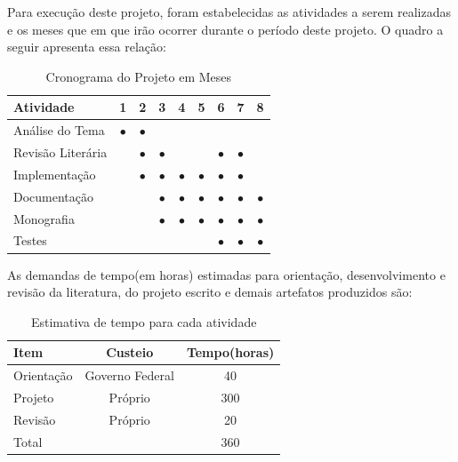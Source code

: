 \documentclass[
	12pt,				    %
	openright,			    %
	oneside,			    %
	a4paper,			    %
    sumario=tradicional,    %
	english,			    %
	brazil,				    %
	]{abntex2}              %
\begin{document}
Para execução deste projeto, foram estabelecidas as atividades a serem realizadas e os meses que em que irão ocorrer durante o período deste projeto. O quadro a seguir apresenta essa relação:

\par

\begin{table}[htbp]
	\centering
	\caption[Cronograma mensal]{Cronograma do Projeto em Meses}
	\label{tab:cronogramaMensal}
	\begin{tabular}{lcccccccc} %
		\toprule
		\textbf{Atividade} & \textbf{1} & \textbf{2} & \textbf{3} & \textbf{4} & \textbf{5} & \textbf{6} & \textbf{7} & \textbf{8} \\
		\midrule
		Análise do Tema    & $\bullet$  & $\bullet$  &            &            &            &            &            &            \\
		Revisão Literária  &            & $\bullet$  & $\bullet$  &            &            & $\bullet$  & $\bullet$  &            \\
		Implementação      &            & $\bullet$  & $\bullet$  & $\bullet$  & $\bullet$  & $\bullet$  & $\bullet$  &            \\
		Documentação       &            &            & $\bullet$  & $\bullet$  & $\bullet$  & $\bullet$  & $\bullet$  & $\bullet$  \\
		Monografia         &            &            & $\bullet$  & $\bullet$  & $\bullet$  & $\bullet$  & $\bullet$  & $\bullet$  \\
		Testes             &            &            &            &            &            & $\bullet$  & $\bullet$  & $\bullet$  \\
		\bottomrule
	\end{tabular}
\end{table}

As demandas de tempo(em horas) estimadas para orientação, desenvolvimento e revisão da literatura, do projeto escrito e demais artefatos produzidos são:

\par

\begin{table}[htpb]
	\centering
	\caption[Cronograma em horas]{Estimativa de tempo para cada atividade}
	\label{tab:cronogramaHoras}
	\begin{tabular}{lcc}
		\toprule
		\textbf{Item} & \textbf{Custeio} & \textbf{Tempo(horas)} \\
		\midrule
		Orientação    & Governo Federal  & 40                    \\
		Projeto       & Próprio          & 300                   \\
		Revisão       & Próprio          & 20                    \\
		\bottomrule
		Total         &                  & 360
	\end{tabular}
\end{table}
\end{document}
